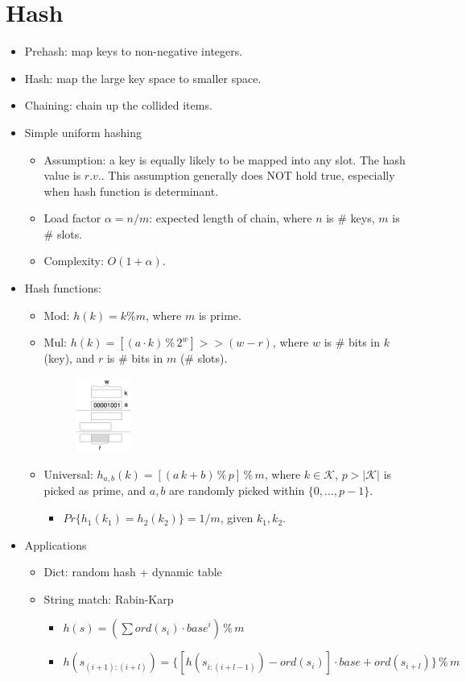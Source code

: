 \documentclass[twocolumn]{article}
\begin{document}
\section{Hash}
\begin{itemize}
\item Prehash: map keys to non-negative integers.
\item Hash: map the large key space to smaller space.
\item Chaining: chain up the collided items.
\item Simple uniform hashing
  \begin{itemize}
  \item Assumption: a key is equally likely to be mapped into any slot. The hash value is $r.v.$. This assumption generally does NOT hold true, especially when hash function is determinant.
  \item Load factor $\alpha=n/m$: expected length of chain, where $n$ is \# keys, $m$ is \# slots.
  \item Complexity: $O(1+\alpha)$.
  \end{itemize}
\item Hash functions:
  \begin{itemize}
  \item Mod: $h(k) = k \% m$, where $m$ is prime.
  \item Mul: $h(k) = [(a\cdot k)\,\%\, 2^w]>>(w-r)$, where $w$ is \# bits in $k$ (key), and $r$ is \# bits in $m$ (\# slots).
    \begin{figure}[H]
    \centering
    \includegraphics[width=0.18\textwidth]{assets/hash-mul}
    \end{figure}
  \item Universal: $h_{a,b}(k) = [(a\,k+b)\,\%\, p]\,\%\,m$, where $k \in \mathcal{K}$, $p > |\mathcal{K}|$ is picked as prime, and $a,b$ are randomly picked within $\{0,...,p-1\}$.
    \begin{itemize}
    \item ${Pr}\{h_1(k_1)=h_2(k_2)\} = 1/m$, given $k_1, k_2$.
    \end{itemize}
  \end{itemize}
\item Applications
  \begin{itemize}
  \item Dict: random hash + dynamic table
  \item String match: Rabin-Karp
    \begin{itemize}
    \item $h(s) = (\sum ord(s_i) \cdot {base}^i)\,\%\,m$
    \item $h(s_{(i+1):(i+l)}) = \{[h(s_{i:(i+l-1)}) - ord(s_i)] \cdot {base} + ord(s_{i+l})\}\,\%\,m$
    \end{itemize}
  \end{itemize}
\end{itemize}
\end{document}
